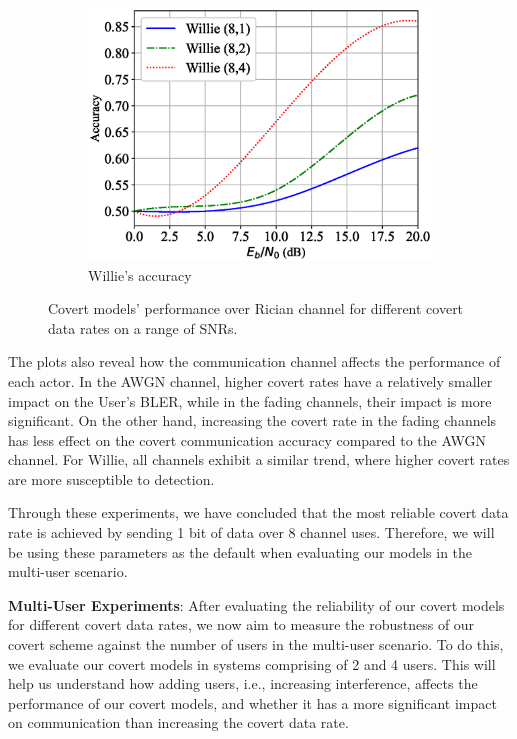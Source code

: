 \begin{figure}[tp!]
\begin{subfigure}{0.28\textwidth}
		\includegraphics[width=\linewidth]{figs/willie_accuracy_rician}
		\caption{Willie's accuracy}
		\label{fig:rician_resutls_willie}
	\end{subfigure}
	\caption{Covert models' performance over Rician channel for different covert data rates on a range of SNRs.}
	\label{fig:rician_resutls}
\end{figure}

The plots also reveal how the communication channel affects the performance of each actor. In the AWGN channel, higher covert rates have a relatively smaller impact on the User's BLER, while in the fading channels, their impact is more significant. On the other hand, increasing the covert rate in the fading channels has less effect on the covert communication accuracy compared to the AWGN channel. For Willie, all channels exhibit a similar trend, where higher covert rates are more susceptible to detection.

Through these experiments, we have concluded that the most reliable covert data rate is achieved by sending 1 bit of data over 8 channel uses. Therefore, we will be using these parameters as the default when evaluating our models in the multi-user scenario.

\textbf{Multi-User Experiments}: 
After evaluating the reliability of our covert models for different covert data rates, we now aim to measure the robustness of our covert scheme against the number of users in the multi-user scenario. To do this, we evaluate our covert models in systems comprising of 2 and 4 users. This will help us understand how adding users, i.e., increasing interference, affects  the performance of our covert models, and whether it has a more significant impact on communication than increasing the covert data rate.

